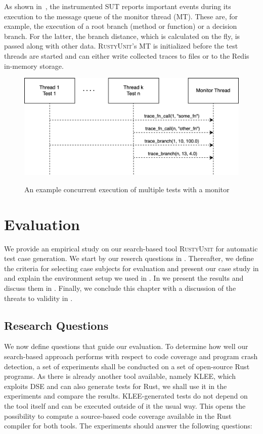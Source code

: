 \documentclass[paper=a4,%
  twoside,%
  BCOR4mm,%
  abstract=true,%
  toc=bibliography,%
  chapterprefix=true,%
  toc=bibliographynumbered,%
  open=right,%
  english,%
  pagesize=pdftex]{scrreprt}
\newcommand{\tech}{\textsc{RustyUnit}\xspace}
\newcommand{\sut}{\ac{SUT}\xspace}
\begin{document}
As shown in~, the instrumented \sut reports important events during its execution to the message queue of the monitor thread (MT). These are, for example, the execution of a root branch (method or function) or a decision branch. For the latter, the branch distance, which is calculated on the fly, is passed along with other data. \tech's MT is initialized before the test threads are started and can either write collected traces to files or to the Redis in-memory storage.

\begin{figure}[h]
\caption{An example concurrent execution of multiple tests with a monitor}
\centering
\includegraphics[width=\textwidth]{test-execution}
\label{fig:test-execution}
\end{figure}

\clearpage
\chapter{Evaluation}
\label{chap:evaluation}

We provide an empirical study on our search-based tool \tech for automatic test case generation. We start by our reserch questions in . Thereafter, we define the criteria for selecting case subjects for evaluation and present our case study in  and explain the environment setup we used in . In  we present the results and discuss them in . Finally, we conclude this chapter with a discussion of the threats to validity in .


\section{Research Questions}
\label{sec:research-questions}
We now define questions that guide our evaluation. To determine how well our search-based approach performs with respect to code coverage and program crash detection, a set of experiments shall be conducted on a set of open-source Rust programs. As there is already another tool available, namely \textsc{KLEE}, which exploits \ac{DSE} and can also generate tests for Rust, we shall use it in the experiments and compare the results. \textsc{KLEE}-generated tests do not depend on the tool itself and can be executed outside of it the usual way. This opens the possibility to compute a source-based code coverage available in the Rust compiler for both tools. The experiments should answer the following questions:
\end{document}
